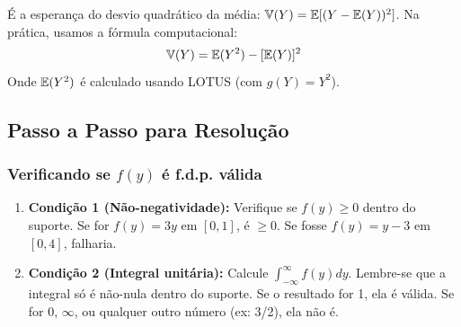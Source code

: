\begin{definicao}[Variância]
É a esperança do desvio quadrático da média: $\mathbb{V}(Y) = \mathbb{E}[(Y - \mathbb{E}(Y))^2]$.
Na prática, usamos a fórmula computacional:
$$ \mathbb{V}(Y) = \mathbb{E}(Y^2) - [\mathbb{E}(Y)]^2 $$
Onde $\mathbb{E}(Y^2)$ é calculado usando LOTUS (com $g(Y) = Y^2$).
\end{definicao}

\subsection{Passo a Passo para Resolução}

\subsubsection{Verificando se $f(y)$ é f.d.p. válida}
\begin{enumerate}
    \item \textbf{Condição 1 (Não-negatividade):} Verifique se $f(y) \ge 0$ dentro do suporte. Se for $f(y)=3y$ em $[0, 1]$, é $\ge 0$. Se fosse $f(y) = y-3$ em $[0, 4]$, falharia.
    \item \textbf{Condição 2 (Integral unitária):} Calcule $\int_{-\infty}^{\infty} f(y) dy$. Lembre-se que a integral só é não-nula dentro do suporte. Se o resultado for 1, ela é válida. Se for 0, $\infty$, ou qualquer outro número (ex: 3/2), ela não é.
\end{enumerate}

